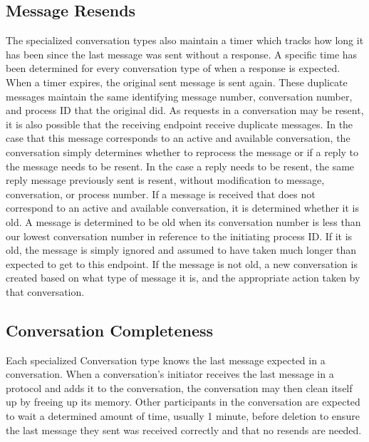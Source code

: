 \documentclass[12pt]{article}
\begin{document}
	\subsection{Message Resends}
		The specialized conversation types also maintain a timer which tracks how long it has been since the last message was sent without a response. A specific time has been determined for every conversation type of when a response is expected. When a timer expires, the original sent message is sent again. These duplicate messages maintain the same identifying message number, conversation number, and process ID that the original did.
		As requests in a conversation may be resent, it is also possible that the receiving endpoint receive duplicate messages. In the case that this message corresponds to an active and available conversation, the conversation simply determines whether to reprocess the message or if a reply to the message needs to be resent. In the case a reply needs to be resent, the same reply message previously sent is resent, without modification to message, conversation, or process number. If a message is received that does not correspond to an active and available conversation, it is determined whether it is old. A message is determined to be old when its conversation number is less than our lowest conversation number in reference to the initiating process ID. If it is old, the message is simply ignored and assumed to have taken much longer than expected to get to this endpoint. If the message is not old, a new conversation is created based on what type of message it is, and the appropriate action taken by that conversation. 
	\subsection{Conversation Completeness}
		Each specialized Conversation type knows the last message expected in a conversation. When a conversation's initiator receives the last message in a protocol and adds it to the conversation, the conversation may then clean itself up by freeing up its memory. Other participants in the conversation are expected to wait a determined amount of time, usually 1 minute, before deletion to ensure the last message they sent was received correctly and that no resends are needed.
\end{document}
